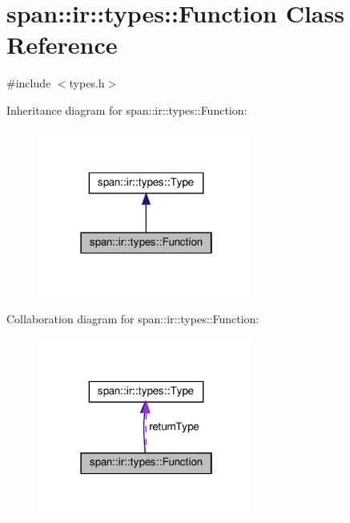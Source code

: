 \hypertarget{classspan_1_1ir_1_1types_1_1Function}{}\section{span\+:\+:ir\+:\+:types\+:\+:Function Class Reference}
\label{classspan_1_1ir_1_1types_1_1Function}


{\ttfamily \#include $<$types.\+h$>$}



Inheritance diagram for span\+:\+:ir\+:\+:types\+:\+:Function\+:\nopagebreak
\begin{figure}[H]
\begin{center}
\leavevmode
\includegraphics[width=202pt]{classspan_1_1ir_1_1types_1_1Function__inherit__graph}
\end{center}
\end{figure}


Collaboration diagram for span\+:\+:ir\+:\+:types\+:\+:Function\+:\nopagebreak
\begin{figure}[H]
\begin{center}
\leavevmode
\includegraphics[width=202pt]{classspan_1_1ir_1_1types_1_1Function__coll__graph}
\end{center}
\end{figure}
